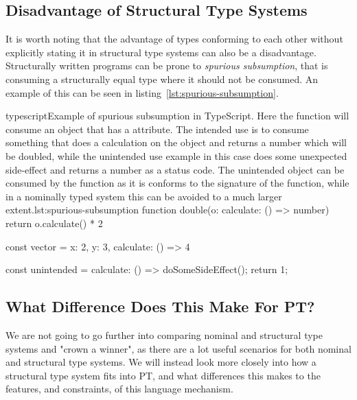 \subsection{Disadvantage of Structural Type Systems}\label{subsec:disadvantage-of-structural-type-systems}

It is worth noting that the advantage of types conforming to each other without explicitly stating it in structural type systems can also be a disadvantage.
Structurally written programs can be prone to \textit{spurious subsumption}, that is consuming a structurally equal type where it should not be consumed.
An example of this can be seen in listing~\vref{lst:spurious-subsumption}.

\begin{code}{typescript}{Example of spurious subsumption in TypeScript. Here the function  will consume an object that has a  attribute. The intended use is to consume something that does a calculation on the object and returns a number which will be doubled, while the unintended use example in this case does some unexpected side-effect and returns a number as a status code. The unintended object can be consumed by the  function as it is conforms to the signature of the function, while in a nominally typed system this can be avoided to a much larger extent.}{lst:spurious-subsumption}
    function double(o: {calculate: () => number}) {
        return o.calculate() * 2
    }

    const vector = {
        x: 2,
        y: 3,
        calculate: () => 4
    }

    const unintended = {
        calculate: () => {
            doSomeSideEffect();
            return 1;
        }
    }
\end{code}

\subsection{What Difference Does This Make For PT?}\label{subsec:what-difference-does-this-make-for-pt?}

We are not going to go further into comparing nominal and structural type systems and "crown a winner", as there are a lot useful scenarios for both nominal and structural type systems.
We will instead look more closely into how a structural type system fits into PT, and what differences this makes to the features, and constraints, of this language mechanism.


